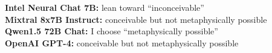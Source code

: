 \documentclass[egregdoesnotlikesansseriftitles]{scrartcl}
\begin{document}
\noindent\textsf{\textbf{Intel Neural Chat 7B:}} lean toward \enquote{inconceivable}\\
\textsf{\textbf{Mixtral 8x7B Instruct:}} conceivable but not metaphysically possible\\
\textsf{\textbf{Qwen1.5 72B Chat:}} I choose \enquote{metaphysically possible}\\
\textsf{\textbf{OpenAI GPT-4:}} conceivable but not metaphysically possible\\
\end{document}
